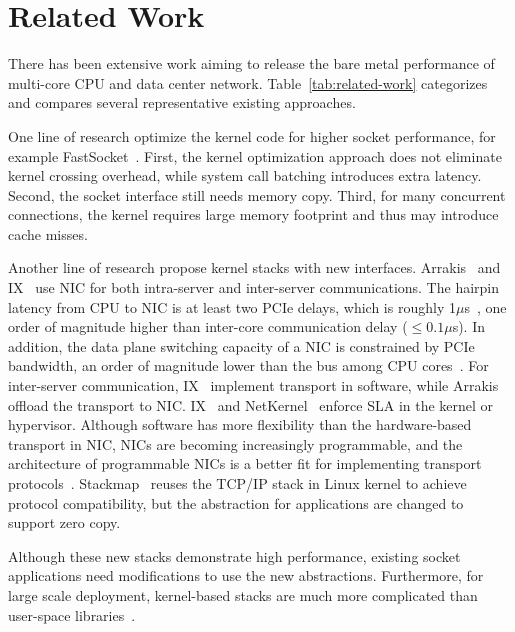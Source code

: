 \section{Related Work}
\label{sec:related}

There has been extensive work aiming to release the bare metal performance of multi-core CPU and data center network. Table~\ref{tab:related-work} categorizes and compares several representative existing approaches.

One line of research optimize the kernel code for higher socket performance, for example FastSocket~\cite{lin2016scalable}.
First, the kernel optimization approach does not eliminate kernel crossing overhead, while system call batching introduces extra latency.
Second, the socket interface still needs memory copy.
Third, for many concurrent connections, the kernel requires large memory footprint and thus may introduce cache misses.


Another line of research propose kernel stacks with new interfaces.
Arrakis~\cite{peter2016arrakis} and IX~\cite{belay2017ix} use NIC for both intra-server and inter-server communications. The hairpin latency from CPU to NIC is at least two PCIe delays, which is roughly 1$\mu$s~\cite{kaminsky2016design}, one order of magnitude higher than inter-core communication delay ($\leq0.1\mu$s). In addition, the data plane switching capacity of a NIC is constrained by PCIe bandwidth, an order of magnitude lower than the bus among CPU cores~\cite{li2017kv}. For inter-server communication, IX~\cite{belay2017ix} implement transport in software, while Arrakis~\cite{peter2016arrakis} offload the transport to NIC. IX~\cite{belay2017ix} and NetKernel~\cite{niu2017network} enforce SLA in the kernel or hypervisor. Although software has more flexibility than the hardware-based transport in NIC, NICs are becoming increasingly programmable, and the architecture of programmable NICs is a better fit for implementing transport protocols~\cite{kaufmann2015flexnic,smartnic,mellanox,cavium}. 
Stackmap~\cite{yasukata2016stackmap} reuses the TCP/IP stack in Linux kernel to achieve protocol compatibility, but the abstraction for applications are changed to support zero copy.

Although these new stacks demonstrate high performance, existing socket applications need modifications to use the new abstractions.
Furthermore, for large scale deployment, kernel-based stacks are much more complicated than user-space libraries~\cite{andromeda}.


